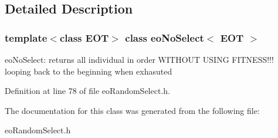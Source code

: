 \subsection{Detailed Description}
\subsubsection*{template$<$class EOT$>$ class eo\-No\-Select$<$ EOT $>$}

eo\-No\-Select: returns all individual in order WITHOUT USING FITNESS!!! looping back to the beginning when exhasuted 



Definition at line 78 of file eo\-Random\-Select.h.

The documentation for this class was generated from the following file:\begin{CompactItemize}
\item 
eo\-Random\-Select.h\end{CompactItemize}
